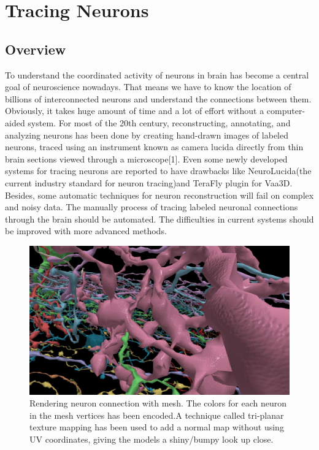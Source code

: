 \documentclass[10pt,twocolumn,letterpaper]{article}
\begin{document}
\section{Tracing Neurons}
\subsection{Overview}
To understand the coordinated activity of neurons in brain has become a central goal of neuroscience nowadays. That means we have to know the location of billions of interconnected neurons and understand the connections between them. Obviously, it takes huge amount of time and a lot of effort without a computer-aided system. For most of the 20th century, reconstructing, annotating, and analyzing neurons has been done by creating hand-drawn images of labeled neurons, traced using an instrument known as camera lucida directly from thin brain sections viewed through a microscope[1]. Even some newly developed systems for tracing neurons are reported to have drawbacks like NeuroLucida(the current industry standard for neuron tracing)and TeraFly plugin for Vaa3D. Besides, some automatic techniques for neuron reconstruction will fail on complex and noisy data. The manually process of tracing labeled neuronal connections through the brain should be automated. The difficulties in current systems should be improved with more advanced methods.

\begin{figure}[h]
\begin{center}
   \includegraphics[width=1.0\linewidth]{gen.png}
\end{center}
   \caption{Rendering neuron connection with mesh. The colors for each neuron in the mesh vertices has been encoded.A technique called tri-planar texture mapping has been used to add a normal map without using UV coordinates, giving the models a shiny/bumpy look up close.}
\label{fig:long}
\label{fig:onecol}
\end{figure}
\end{document}
